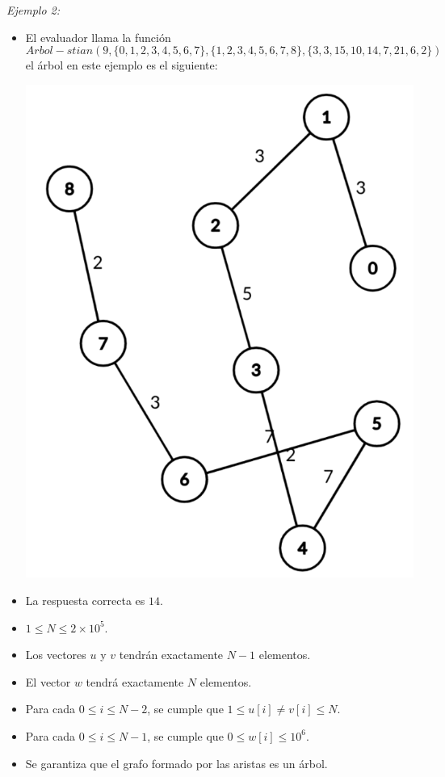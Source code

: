 \documentclass[12pt]{scrartcl}
\begin{document}
        {\itshape Ejemplo 2:}
        \begin{itemize}
            \item El evaluador llama la función $$Arbol-stian(9, \{0, 1, 2, 3, 4, 5, 6, 7\}, \{1, 2, 3, 4, 5, 6, 7, 8\}, \{3, 3, 15, 10, 14, 7, 21, 6, 2\})$$ el árbol en este ejemplo es el siguiente:
            \begin{center}
                \includegraphics[scale=0.25]{ej2.png}
            \end{center}
            \item La respuesta correcta es $14$.
        \end{itemize}
        

        \begin{itemize}
            \item $1 \le N \le 2\times10^5$.
            \item Los vectores $u$ y $v$ tendrán exactamente $N - 1$ elementos.
            \item El vector $w$ tendrá exactamente $N$ elementos.
            \item Para cada $0 \le i \le N - 2$, se cumple que $1 \le u[i] \neq v[i] \le N$. 
            \item Para cada $0 \le i \le N - 1$, se cumple que $0 \le w[i] \le 10^6$.
            \item Se garantiza que el grafo formado por las aristas es un árbol.
        \end{itemize}
    
\end{document}
